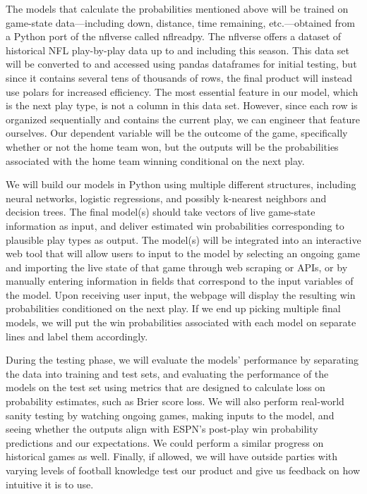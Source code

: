 \documentclass[conference]{IEEEtran}
\begin{document}
The models that calculate the probabilities mentioned above will be trained on
game-state data---including down, distance, time remaining, etc.---obtained
from a Python port of the nflverse called nflreadpy. The nflverse offers a
dataset of historical NFL play-by-play data up to and including this season.
This data set will be converted to and accessed using pandas dataframes for
initial testing, but since it contains several tens of thousands of rows, the
final product will instead use polars for increased efficiency. The most
essential feature in our model, which is the next play type, is not a column in
this data set. However, since each row is organized sequentially and contains
the current play, we can engineer that feature ourselves. Our dependent
variable will be the outcome of the game, specifically whether or not the home
team won, but the outputs will be the probabilities associated with the home
team winning conditional on the next play.

We will build our models in Python using multiple different structures,
including neural networks, logistic regressions, and possibly k-nearest
neighbors and decision trees. The final model(s) should take vectors of live
game-state information as input, and deliver estimated win probabilities
corresponding to plausible play types as output. The model(s) will be
integrated into an interactive web tool that will allow users to input to the
model by selecting an ongoing game and importing the live state of that game
through web scraping or APIs, or by manually entering information in fields
that correspond to the input variables of the model. Upon receiving user input,
the webpage will display the resulting win probabilities conditioned on the
next play. If we end up picking multiple final models, we will put the win
probabilities associated with each model on separate lines and label them
accordingly.

During the testing phase, we will evaluate the models' performance by
separating the data into training and test sets, and evaluating the performance
of the models on the test set using metrics that are designed to calculate loss
on probability estimates, such as Brier score loss. We will also perform
real-world sanity testing by watching ongoing games, making inputs to the
model, and seeing whether the outputs align with ESPN's post-play win
probability predictions and our expectations. We could perform a similar
progress on historical games as well. Finally, if allowed, we will have outside
parties with varying levels of football knowledge test our product and give us
feedback on how intuitive it is to use.
\end{document}

